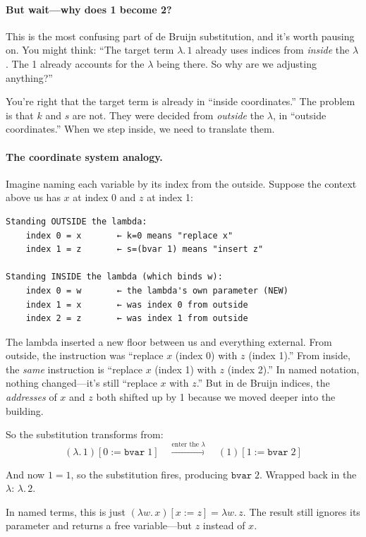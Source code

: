 \documentclass[11pt,a4paper]{article}
\theoremstyle{definition}
\newcommand{\lam}{\lambda}
\begin{document}
\paragraph{But wait---why does 1 become 2?}

This is the most confusing part of de Bruijn substitution, and it's worth
pausing on. You might think: ``The target term $\lam.\, 1$ already uses
indices from \emph{inside} the $\lam$. The 1 already accounts for the $\lam$
being there. So why are we adjusting anything?''

You're right that the target term is already in ``inside coordinates.'' The
problem is that $k$ and $s$ are not. They were decided from \emph{outside} the
$\lam$, in ``outside coordinates.'' When we step inside, we need to translate
them.

\paragraph{The coordinate system analogy.}
Imagine naming each variable by its index from the outside. Suppose
the context above us has $x$ at index 0 and $z$ at index 1:

\begin{verbatim}
Standing OUTSIDE the lambda:
    index 0 = x       ← k=0 means "replace x"
    index 1 = z       ← s=(bvar 1) means "insert z"

Standing INSIDE the lambda (which binds w):
    index 0 = w       ← the lambda's own parameter (NEW)
    index 1 = x       ← was index 0 from outside
    index 2 = z       ← was index 1 from outside
\end{verbatim}

The lambda inserted a new floor between us and everything external.
From outside, the instruction was ``replace $x$ (index 0) with $z$ (index 1).''
From inside, the \emph{same} instruction is ``replace $x$ (index 1) with $z$
(index 2).'' In named notation, nothing changed---it's still ``replace $x$ with
$z$.'' But in de Bruijn indices, the \emph{addresses} of $x$ and $z$ both
shifted up by 1 because we moved deeper into the building.

So the substitution transforms from:
\[
  (\lam.\, 1)[0 := \texttt{bvar}\;1]
  \quad\xrightarrow{\text{enter the } \lam}\quad
  (1)[1 := \texttt{bvar}\;2]
\]

And now $1 = 1$, so the substitution fires, producing $\texttt{bvar}\;2$.
Wrapped back in the $\lam$: $\lam.\, 2$.

In named terms, this is just $(\lam w.\, x)[x := z] = \lam w.\, z$. The
result still ignores its parameter and returns a free variable---but $z$
instead of $x$.
\end{document}
